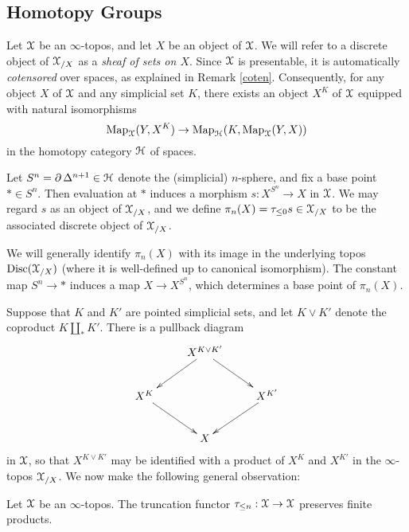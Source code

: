 \subsection{Homotopy Groups}\label{homotopysheaves}

Let $\operatorname{\mathcal{X}}$ be an $\infty$-topos, and let $X$ be an object of
$\operatorname{\mathcal{X}}$. We will refer to a discrete object of $\operatorname{\mathcal{X}}_{/X}$ as a {\it sheaf of sets on $X$}.
Since $\operatorname{\mathcal{X}}$ is presentable, it is automatically {\em cotensored} over
spaces, as explained in Remark \ref{coten}. Consequently, for any object $X$ of
$\operatorname{\mathcal{X}}$ and any simplicial set $K$, there exists an object $X^K$ of $\operatorname{\mathcal{X}}$ equipped with natural isomorphisms
$$ \operatorname{{Map}}_{\operatorname{\mathcal{X}}}( Y, X^K ) \rightarrow \operatorname{{Map}}_{\operatorname{\mathcal{H}}}( K, \operatorname{{Map}}_{\operatorname{\mathcal{X}}}(Y,X) )$$
in the homotopy category $\operatorname{\mathcal{H}}$ of spaces.

\begin{definition}
Let $S^n  = \operatorname{\partial} \Delta^{n+1} \in \operatorname{\mathcal{H}}$ denote the (simplicial) $n$-sphere, and fix a base point $\ast \in S^n$. Then evaluation at $\ast$ induces a morphism $s: X^{S^n} \rightarrow X$ in $\operatorname{\mathcal{X}}$.
We may regard $s$ as an object of $\operatorname{\mathcal{X}}_{/X}$, and we define $\pi_n(X) = \tau_{\leq 0} s \in \operatorname{\mathcal{X}}_{/X}$ to be the associated discrete object of $\operatorname{\mathcal{X}}_{/X}$.
\end{definition}

 We will generally identify $\pi_n(X)$ with its image in the underlying topos $\operatorname{Disc}(\operatorname{\mathcal{X}}_{/X})$ (where it is well-defined up to canonical isomorphism). The constant map $S^n \rightarrow \ast$ induces
a map $X \rightarrow X^{S^n}$, which determines a base point of $\pi_n(X)$. 

Suppose that $K$ and $K'$ are pointed simplicial sets, and let $K \vee K'$ denote the coproduct $K \amalg_{\ast} K'$. There is a pullback diagram
$$ \xymatrix{ & X^{K \vee K'} \ar[dr] \ar[dl] & \\
X^K \ar[dr] & & X^{K'} \ar[dl] \\
& X & }$$
in $\operatorname{\mathcal{X}}$, so that $X^{K \vee K'}$ may be identified with a product
of $X^K$ and $X^{K'}$ in the $\infty$-topos $\operatorname{\mathcal{X}}_{/X}$. We now make the following
general observation:

\begin{lemma}\label{slurpy}
Let $\operatorname{\mathcal{X}}$ be an $\infty$-topos. The truncation functor $\tau_{\leq n}: \operatorname{\mathcal{X}} \rightarrow \operatorname{\mathcal{X}}$
preserves finite products.
\end{lemma}

